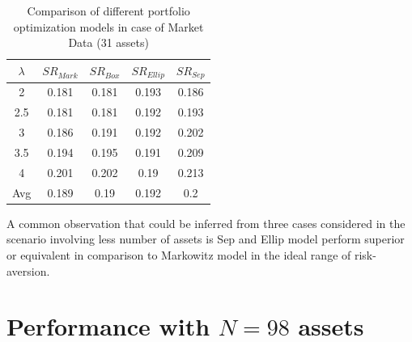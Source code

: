 \begin{table}[!h]
    \centering
    \captionsetup{justification=centering}
   \begin{tabular}{||c|c|c|c|c||}
   \hline
  
  
  $\lambda$ & $SR_{Mark}$ & $SR_{Box}$ & $SR_{Ellip}$ & $SR_{Sep}$ \\
  
  \hline
 2 & 0.181 & 0.181 & 0.193 & 0.186 \\
 2.5 & 0.181 & 0.181 & 0.192 & 0.193 \\
 3 & 0.186 & 0.191 & 0.192 & 0.202 \\
 3.5 & 0.194 & 0.195 & 0.191 & 0.209 \\
 4 & 0.201 & 0.202 & 0.19 & 0.213 \\
  \hline
  Avg & 0.189 & 0.19 & 0.192 & 0.2 \\
  \hline

\end{tabular}
    \caption{Comparison of different portfolio optimization models in case of Market Data (31 assets)}
    \label{tab:3}
\end{table}

A common observation that could be inferred from three cases considered in the scenario involving less number of assets is Sep and Ellip model perform superior or equivalent in comparison to Markowitz model in the ideal range of risk-aversion.


\section{Performance with $N=98$ assets}


